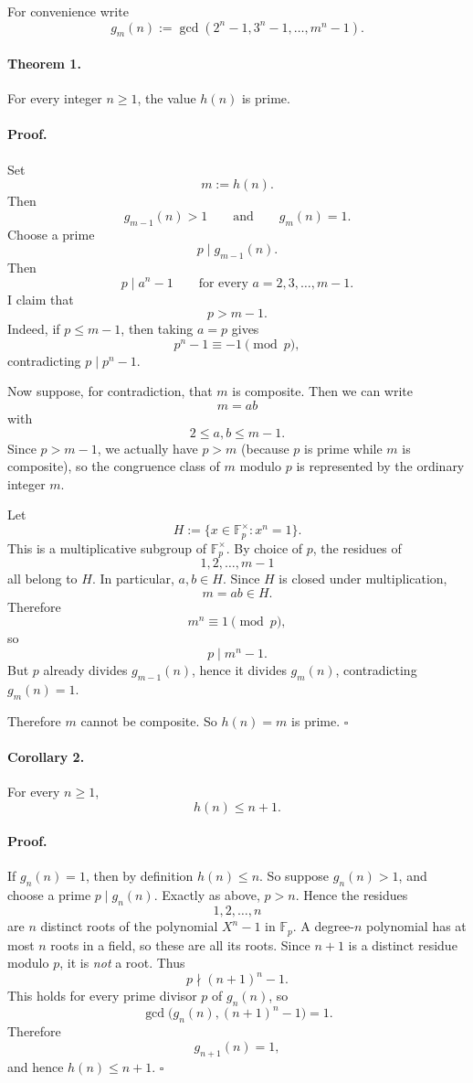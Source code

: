 For convenience write
\[
g_m(n):=\gcd(2^n-1,3^n-1,\dots,m^n-1).
\]

\paragraph{Theorem 1.}
For every integer $n\ge 1$, the value $h(n)$ is prime.

\paragraph{Proof.}
Set
\[
m:=h(n).
\]
Then
\[
g_{m-1}(n)>1
\qquad\text{and}\qquad
g_m(n)=1.
\]
Choose a prime
\[
p\mid g_{m-1}(n).
\]
Then
\[
p\mid a^n-1
\qquad\text{for every } a=2,3,\dots,m-1.
\]
I claim that
\[
p>m-1.
\]
Indeed, if $p\le m-1$, then taking $a=p$ gives
\[
p^n-1\equiv -1\pmod p,
\]
contradicting $p\mid p^n-1$.

Now suppose, for contradiction, that $m$ is composite.
Then we can write
\[
m=ab
\]
with
\[
2\le a,b\le m-1.
\]
Since $p>m-1$, we actually have $p>m$ (because $p$ is prime while $m$ is composite), so the congruence class of $m$ modulo $p$ is represented by the ordinary integer $m$.

Let
\[
H:=\{x\in \mathbb F_p^\times : x^n=1\}.
\]
This is a multiplicative subgroup of $\mathbb F_p^\times$.
By choice of $p$, the residues of
\[
1,2,\dots,m-1
\]
all belong to $H$.
In particular, $a,b\in H$.
Since $H$ is closed under multiplication,
\[
m=ab\in H.
\]
Therefore
\[
m^n\equiv 1\pmod p,
\]
so
\[
p\mid m^n-1.
\]
But $p$ already divides $g_{m-1}(n)$, hence it divides $g_m(n)$, contradicting $g_m(n)=1$.

Therefore $m$ cannot be composite.
So $h(n)=m$ is prime.
\hfill$\square$

\paragraph{Corollary 2.}
For every $n\ge 1$,
\[
h(n)\le n+1.
\]

\paragraph{Proof.}
If $g_n(n)=1$, then by definition $h(n)\le n$.
So suppose $g_n(n)>1$, and choose a prime $p\mid g_n(n)$.
Exactly as above, $p>n$.
Hence the residues
\[
1,2,\dots,n
\]
are $n$ distinct roots of the polynomial $X^n-1$ in $\mathbb F_p$.
A degree-$n$ polynomial has at most $n$ roots in a field, so these are all its roots.
Since $n+1$ is a distinct residue modulo $p$, it is \emph{not} a root.
Thus
\[
p\nmid (n+1)^n-1.
\]
This holds for every prime divisor $p$ of $g_n(n)$, so
\[
\gcd\bigl(g_n(n),(n+1)^n-1\bigr)=1.
\]
Therefore
\[
g_{n+1}(n)=1,
\]
and hence $h(n)\le n+1$.
\hfill$\square$

